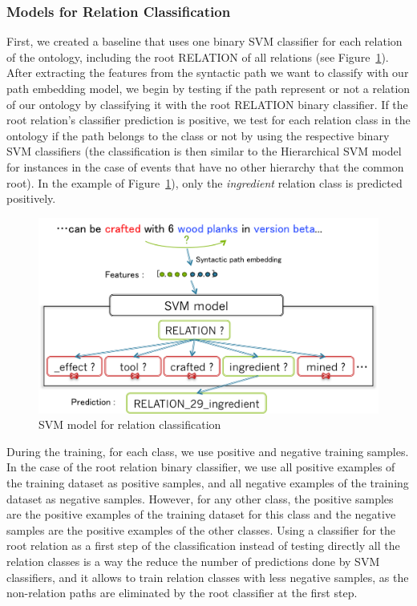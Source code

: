\documentclass[twocolumn]{article}
\begin{document}
\subsubsection{Models for Relation Classification}

First, we created a baseline that uses one binary SVM classifier for each relation of the ontology, including the root RELATION of all relations (see Figure~\ref{relationClassificationBaseline}).
After extracting the features from the syntactic path we want to classify with our path embedding model, we begin by testing if the path represent or not a relation of our ontology by classifying it with the root RELATION binary classifier. If the root relation's classifier prediction is positive, we test for each relation class in the ontology if the path belongs to the class or not by using the respective binary SVM classifiers (the classification is then similar to the Hierarchical SVM model for instances in the case of events that have no other hierarchy that the common root). In the example of Figure~\ref{relationClassificationBaseline}), only the \textit{ingredient} relation class is predicted positively.

\begin{figure}[t]
   \centering \includegraphics[width=\linewidth]{Figures/Semantic_Parsing/relationClassificationBaseline.png}
   \caption{\label{relationClassificationBaseline} SVM model for relation classification}
\end{figure}

During the training, for each class, we use positive and negative training samples. In the case of the root relation binary classifier, we use all positive examples of the training dataset as positive samples, and all negative examples of the training dataset as negative samples. However, for any other class, the positive samples are the positive examples of the training dataset for this class and the negative samples are the positive examples of the other classes. Using a classifier for the root relation as a first step of the classification instead of testing directly all the relation classes is a way the reduce the number of predictions done by SVM classifiers, and it allows to train relation classes with less negative samples, as the non-relation paths are eliminated by the root classifier at the first step.
\end{document}
